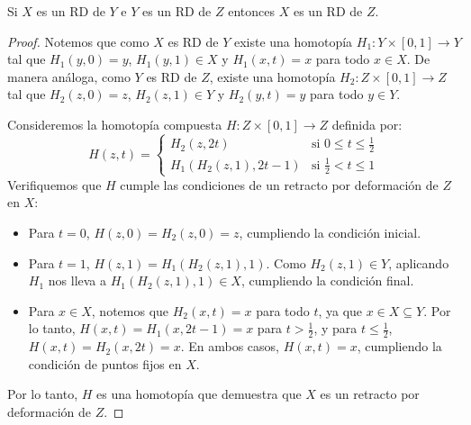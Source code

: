 \documentclass{article}
\theoremstyle{plain}
\theoremstyle{definition}
\newenvironment{ejercicio}[1]{\begin{trivlist}
\item[\hskip \labelsep {\bfseries Ejercicio}\hskip \labelsep {\bfseries #1.}]}{\end{trivlist}}
\begin{document}
\begin{ejercicio}{11}
    Si \( X \) es un RD de \( Y \) e \( Y \) es un RD de \( Z \) entonces \( X \) es un RD de \( Z \).
\end{ejercicio}
\begin{proof}
    Notemos que como \( X \) es RD de \( Y \) existe una homotopía \( H_1 : Y \times [0, 1] \to Y \) tal que \( H_1(y,0) = y \), \( H_1(y,1) \in X \) y \( H_1(x,t) = x \) para todo \( x \in X \).
    De manera análoga, como \( Y \) es RD de \( Z \), existe una homotopía \( H_2 : Z \times [0, 1] \to Z \) tal que \( H_2(z,0) = z \), \( H_2(z,1) \in Y \) y \( H_2(y,t) = y \) para todo \( y \in Y \).

    Consideremos la homotopía compuesta \( H : Z \times [0, 1] \to Z \) definida por:
    \[
        H(z, t) = \begin{cases}
            H_2(z, 2t)             & \text{si } 0 \le t \le \frac{1}{2} \\
            H_1(H_2(z, 1), 2t - 1) & \text{si } \frac{1}{2} < t \le 1
        \end{cases}
    \]
    Verifiquemos que \( H \) cumple las condiciones de un retracto por deformación de \( Z \) en \( X \):
    \begin{itemize}
        \item Para \( t=0 \), \( H(z, 0) = H_2(z, 0) = z \), cumpliendo la condición inicial.
        \item Para \( t=1 \), \( H(z, 1) = H_1(H_2(z, 1), 1) \). Como \( H_2(z, 1) \in Y \), aplicando \( H_1 \) nos lleva a \( H_1(H_2(z, 1), 1) \in X \), cumpliendo la condición final.
        \item Para \( x \in X \), notemos que \( H_2(x, t) = x \) para todo \( t \), ya que \( x \in X \subseteq Y \). Por lo tanto, \( H(x, t) = H_1(x, 2t - 1) = x \) para \( t > \frac{1}{2} \), y para \( t \le \frac{1}{2} \), \( H(x, t) = H_2(x, 2t) = x \). En ambos casos, \( H(x, t) = x \), cumpliendo la condición de puntos fijos en \( X \).
    \end{itemize}
    Por lo tanto, \( H \) es una homotopía que demuestra que \( X \) es un retracto por deformación de \( Z \).
\end{proof}

\vspace{0.5cm}
\end{document}
